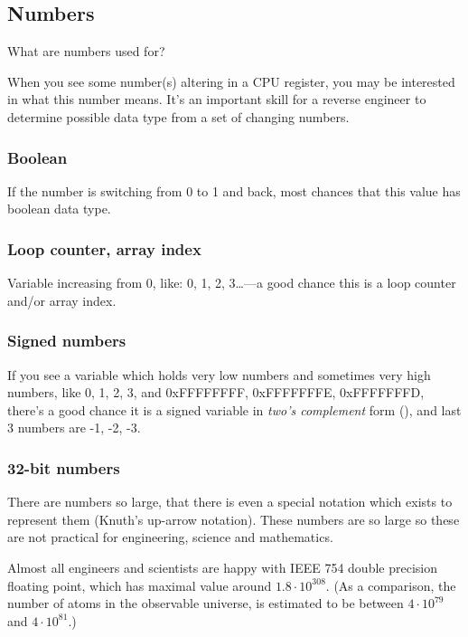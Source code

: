 \subsection{Numbers}

What are numbers used for?

When you see some number(s) altering in a CPU register, you may be interested in what this number means.
It's an important skill for a reverse engineer to determine possible data type from a set of changing numbers.

\subsubsection{Boolean}

If the number is switching from 0 to 1 and back, most chances that this value has boolean data type.

\subsubsection{Loop counter, array index}

Variable increasing from 0, like: 0, 1, 2, 3\dots---a good chance this is a loop counter and/or array index.

\subsubsection{Signed numbers}

If you see a variable which holds very low numbers and sometimes very high numbers,
like 0, 1, 2, 3, and 0xFFFFFFFF, 0xFFFFFFFE, 0xFFFFFFFD,
there's a good chance it is a signed variable in \emph{two's complement} form (),
and last 3 numbers are -1, -2, -3.

\subsubsection{32-bit numbers}

There are numbers so large,
that there is even a special notation which exists to represent them (Knuth's up-arrow notation).
These numbers are so large so these are not practical for engineering, science and mathematics.

Almost all engineers and scientists are happy with IEEE 754 double precision floating point, which has maximal
value around $1.8 \cdot 10^{308}$.
(As a comparison, the number of atoms in the observable universe, is estimated to be between
$4 \cdot 10^{79}$ and $4 \cdot 10^{81}$.)

